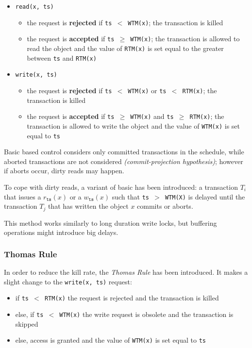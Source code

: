 \documentclass[english]{article}
\begin{document}
\begin{itemize}
  \item \texttt{read(x, ts)}
        \begin{itemize}
          \item the request is \textbf{rejected} if \texttt{ts \(<\) WTM(x)}; the transaction is killed
          \item the request is \textbf{accepted} if \texttt{ts \(\geq\) WTM(x)}; the transaction is allowed to read the object and the value of \texttt{RTM(x)} is set equal to the greater between \texttt{ts} and \texttt{RTM(x)}
        \end{itemize}
  \item \texttt{write(x, ts)}
        \begin{itemize}
          \item the request is \textbf{rejected} if \texttt{ts \(<\) WTM(x)} or \texttt{ts \(<\) RTM(x)}; the transaction is killed
          \item the request is \textbf{accepted} if \texttt{ts \(\geq\) WTM(x)} and \texttt{ts \(\geq\) RTM(x)}; the transaction is allowed to write the object and the value of \texttt{WTM(x)} is set equal to \texttt{ts}
        \end{itemize}
\end{itemize}

\bigskip
Basic \TS based control considers only committed transactions in the schedule, while aborted transactions are not considered \textit{(commit-projection hypothesis)};
however if aborts occur, dirty reads may happen.

To cope with dirty reads, a variant of basic \TS has been introduced: a transaction \(T_i\) that issues a \(r_{\texttt{ts}}(x)\) or a \(w_{\texttt{ts}}(x)\) such that \texttt{ts \(>\) WTM(X)} is delayed until the transaction \(T_j\) that has written the object \(x\) commits or aborts.

This method works similarly to long duration write locks, but buffering operations might introduce big delays.

\subsubsection{Thomas Rule}

In order to reduce the kill rate, the \textit{Thomas Rule} has been introduced.
It makes a slight change to the \texttt{write(x, ts)} request:

\begin{itemize}
  \item if \texttt{ts \(<\) RTM(x)} the request is rejected and the transaction is killed
  \item else, if \texttt{ts \(<\) WTM(x)} the write request is obsolete and the transaction is skipped
  \item else, access is granted and the value of \texttt{WTM(x)} is set equal to \texttt{ts}
\end{itemize}
\end{document}

